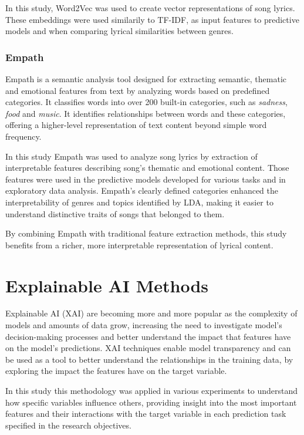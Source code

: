 In this study, Word2Vec was used to create vector representations of song
lyrics. These embeddings  were used similarily to TF-IDF, as input features
to predictive models and when comparing lyrical similarities between genres.



\subsubsection*{Empath}
Empath is a semantic analysis tool designed for extracting
semantic, thematic and emotional features from text by analyzing words based on
predefined categories. It classifies words into over 200 built-in categories,
such as \textit{sadness}, \textit{food} and \textit{music}. It  identifies
relationships between words and these categories, offering a higher-level
representation of text content beyond simple word frequency. \cite{empath}

In this study Empath was used to analyze song lyrics by extraction of 
interpretable features describing song's thematic and emotional content.
Those features were used in the predictive models developed for various
tasks and in exploratory data analysis. Empath's clearly defined  categories 
enhanced the interpretability of genres and topics identified by LDA, 
making it easier to understand distinctive traits of songs that belonged to
them.

By combining Empath with traditional feature extraction methods, this study
benefits from a richer, more interpretable representation of lyrical content.


\section{Explainable AI Methods}
\label{sec:explainableaimethods}

Explainable AI (XAI) are becoming more and more popular as the complexity of
models and amounts of data grow, increasing the need to investigate model's
decision-making processes and better understand the impact that features have
on the model's predictions. XAI techniques enable model  transparency and can
be used as a  tool to better understand the relationships in the training data,
by exploring the impact the features have on the target variable. 

In this study this methodology was applied in various experiments to understand
how specific variables influence others, providing insight into the most
important features and their interactions with the target variable in each
prediction task specified in the research objectives.



